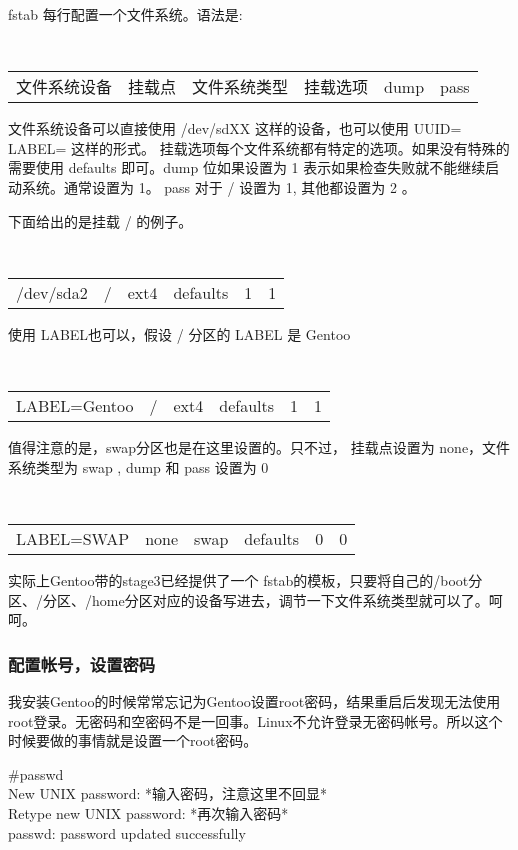 fstab 每行配置一个文件系统。语法是:
\begin{small}
\tt 
\begin{longtable}{cccccc}
文件系统设备	& 挂载点 & 文件系统类型 & 挂载选项 & dump & pass
\end{longtable}
\end{small}

文件系统设备可以直接使用 /dev/sdXX 这样的设备，也可以使用 UUID= LABEL= 这样的形式。
挂载选项每个文件系统都有特定的选项。如果没有特殊的需要使用 defaults 即可。dump 位如果设置为 1 表示如果检查失败就不能继续启动系统。通常设置为 1。
pass 对于 / 设置为 1, 其他都设置为 2 。

下面给出的是挂载 / 的例子。
\begin{small}
\tt 
\begin{longtable}{cccccc}
/dev/sda2	& /	 & ext4	& defaults & 1 & 1
\end{longtable}
\end{small}

使用 LABEL也可以，假设 / 分区的 LABEL 是 Gentoo

\begin{small}
\tt 
\begin{longtable}{cccccc}
LABEL=Gentoo	& /	 & ext4	& defaults & 1 & 1
\end{longtable}
\end{small}

值得注意的是，swap分区也是在这里设置的。只不过， 挂载点设置为 none，文件系统类型为 swap , dump 和 pass 设置为 0 

\begin{small}
\tt 
\begin{longtable}{cccccc}
LABEL=SWAP	& none	 & swap	& defaults & 0 & 0
\end{longtable}
\end{small}

实际上Gentoo带的stage3已经提供了一个 fstab的模板，只要将自己的/boot分区、/分区、/home分区对应的设备写进去，调节一下文件系统类型就可以了。呵呵。


\subsubsection{配置帐号，设置密码}

我安装Gentoo的时候常常忘记为Gentoo设置root密码，结果重启后发现无法使用root登录。无密码和空密码不是一回事。Linux不允许登录无密码帐号。所以这个时候要做的事情就是设置一个root密码。

\begin{code}
\#passwd\\
New UNIX password: *输入密码，注意这里不回显*\\
Retype new UNIX password: *再次输入密码*\\
passwd: password updated successfully
\end{code}

